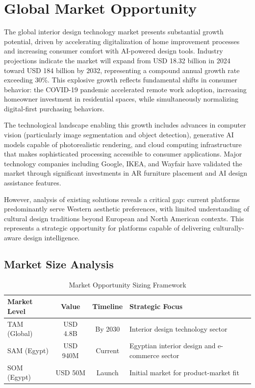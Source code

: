 \section{Global Market Opportunity}
\label{sec:app_global_opportunity}

The global interior design technology market presents substantial growth potential, driven by accelerating digitalization of home improvement processes and increasing consumer comfort with AI-powered design tools. Industry projections indicate the market will expand from USD 18.32 billion in 2024 toward USD 184 billion by 2032, representing a compound annual growth rate exceeding 30\%. This explosive growth reflects fundamental shifts in consumer behavior: the COVID-19 pandemic accelerated remote work adoption, increasing homeowner investment in residential spaces, while simultaneously normalizing digital-first purchasing behaviors.

The technological landscape enabling this growth includes advances in computer vision (particularly image segmentation and object detection), generative AI models capable of photorealistic rendering, and cloud computing infrastructure that makes sophisticated processing accessible to consumer applications. Major technology companies including Google, IKEA, and Wayfair have validated the market through significant investments in AR furniture placement and AI design assistance features.

However, analysis of existing solutions reveals a critical gap: current platforms predominantly serve Western aesthetic preferences, with limited understanding of cultural design traditions beyond European and North American contexts. This represents a strategic opportunity for platforms capable of delivering culturally-aware design intelligence.

\subsection{Market Size Analysis}

\begin{table}[htbp]
\centering
\caption{Market Opportunity Sizing Framework}
\label{tab:tam_analysis}
\begin{tabular}{lccp{5cm}}
\toprule
\textbf{Market Level} & \textbf{Value} & \textbf{Timeline} & \textbf{Strategic Focus} \\
\midrule
TAM (Global) & USD 4.8B & By 2030 & Interior design technology sector \\
SAM (Egypt) & USD 940M & Current & Egyptian interior design and e-commerce sector \\
SOM (Egypt) & USD 50M & Launch & Initial market for product-market fit \\
\bottomrule
\end{tabular}
\end{table}

